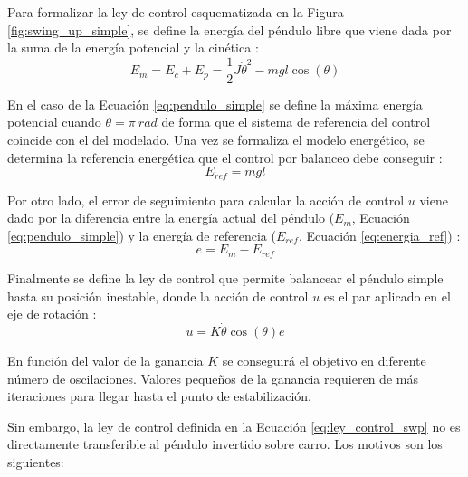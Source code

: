\documentclass[11pt,fleqn]{book} %
\begin{document}
Para formalizar la ley de control esquematizada en la Figura \ref{fig:swing_up_simple}, se define la energía del péndulo libre que viene dada por la suma de la energía potencial y la cinética \cite{astrom2000swinging}: 
\begin{equation}
		E_m = E_c + E_p = \frac{1}{2}J\dot{\theta}^2 - mgl\cos(\theta) 
	\label{eq:pendulo_simple}
\end{equation}

En el caso de la Ecuación \ref{eq:pendulo_simple} se define la máxima energía potencial cuando $\theta = \pi\ rad$ de forma que el sistema de referencia del control coincide con el del modelado. Una vez se formaliza el modelo energético, se determina la referencia energética que el control por balanceo debe conseguir \cite{astrom2000swinging}:
\begin{equation}
		E_{ref} = mgl
	\label{eq:energia_ref}
\end{equation}

Por otro lado, el error de seguimiento para calcular la acción de control $u$ viene dado por la diferencia entre la energía actual del péndulo ($E_m$, Ecuación \ref{eq:pendulo_simple}) y la energía de referencia ($E_{ref}$, Ecuación \ref{eq:energia_ref}) \cite{astrom2000swinging}:
\begin{equation}
		e = E_{m} - E_{ref}
	\label{eq:error_energia}
\end{equation}

Finalmente se define la ley de control que permite balancear el péndulo simple hasta su posición inestable, donde la acción de control $u$ es el par aplicado en el eje de rotación \cite{astrom2000swinging}: 
\begin{equation}
		u = K\dot{\theta}\cos(\theta)e
	\label{eq:ley_control_swp}
\end{equation}

En función del valor de la ganancia $K$ se conseguirá el objetivo en diferente número de oscilaciones. Valores pequeños de la ganancia requieren de más iteraciones para llegar hasta el punto de estabilización. 

Sin embargo, la ley de control definida en la Ecuación \ref{eq:ley_control_swp} no es directamente transferible al péndulo invertido sobre carro. Los motivos son los siguientes:
\end{document}

